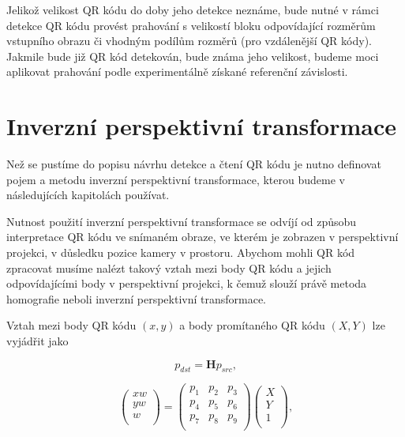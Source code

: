 Jelikož velikost QR kódu do doby jeho detekce neznáme, bude nutné v rámci
detekce QR kódu provést prahování s velikostí bloku odpovídající rozměrům
vstupního obrazu či vhodným podílům rozměrů (pro vzdálenější QR kódy). Jakmile
bude již QR kód detekován, bude známa jeho velikost, budeme moci aplikovat
prahování podle experimentálně získané referenční závislosti.

\section{Inverzní perspektivní transformace}
\label{inverzniPerspektivniTransformace}

Než se pustíme do popisu návrhu detekce a čtení QR kódu je nutno definovat pojem
a metodu inverzní perspektivní transformace, kterou budeme v následujících
kapitolách používat.

Nutnost použití inverzní perspektivní transformace se odvíjí od způsobu
interpretace QR kódu ve snímaném obraze, ve kterém je zobrazen v perspektivní
projekci, v důsledku pozice kamery v prostoru. Abychom mohli QR kód zpracovat
musíme nalézt takový vztah mezi body QR kódu a jejich odpovídajícími body v
perspektivní projekci, k čemuž slouží právě metoda homografie neboli inverzní
perspektivní transformace.

\bigskip \noindent Vztah mezi body QR kódu $(x,y)$ a body promítaného QR kódu
$(X,Y)$ lze vyjádřit jako

\begin{equation}
  p_{dst} = \mathbf{H} p_{src}\mbox{,}
\end{equation}

\begin{equation}
  \left(
    \begin{array}{c}
      x w \\
      y w \\
      w \\
    \end{array}
  \right)
  =
  \left(
    \begin{array}{ccc}
      p_{1} & p_{2}  & p_{3} \\
      p_{4} & p_{5}  & p_{6} \\
      p_{7} & p_{8}  & p_{9} \\
    \end{array}
  \right)
  \left(
    \begin{array}{c}
      X \\
      Y \\
      1 \\
    \end{array}
  \right)\mbox{,}
\end{equation}

